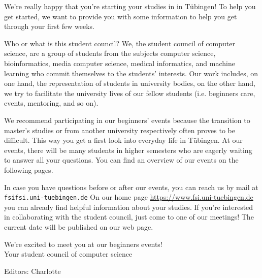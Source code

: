 \thispagestyle{firststyle}
We're really happy that you're starting your studies in \studiengang in Tübingen!
To help you get started, we want to provide you with some information to help you get through your first few weeks.

Who or what is this \glqq student council\grqq? We, the student council of computer science, are a group of students from the subjects computer science, bioinformatics, media computer science, medical informatics, and machine learning
who commit themselves to the students' interests. Our work includes, on one hand, the representation of students in university bodies, on the other hand, we try to facilitate the university lives of our fellow students (i.e. beginners care,
events, mentoring, and so on).

\ifmaster
    \ifml
We recommend participating in our beginners' events because the transition to master's studies or from another university respectively often proves to be difficult. This way you get a first look into everyday life in Tübingen.
    \fi
\fi
At our events, there will be many students in higher semesters who are eagerly waiting to answer all your questions. You can find an overview of our events on the following pages.

In case you have questions before or after our events, you can reach us by mail at \texttt{fsi\At fsi.uni-tuebingen.de}
On our home page
\url{https://www.fsi.uni-tuebingen.de} you can already find helpful information about your studies. If you're interested in collaborating with the student council, just come to one of our meetings! The current date will be published on our web page.

We're excited to meet you at our beginners events!\\
Your student council of computer science
\enlargethispage{3\baselineskip} %
\par\hfill{\footnotesize Editors: Charlotte}
\vfill

